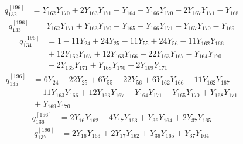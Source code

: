 \begin{equation}\label{q196:row:132}
\begin{aligned}
q_{132}^{[196]} &={} Y_{162}Y_{170} + 2Y_{163}Y_{171} - Y_{164} - Y_{166}Y_{170} - 2Y_{167}Y_{171} - Y_{168}
\end{aligned}
\end{equation}
\begin{equation}\label{q196:row:133}
\begin{aligned}
q_{133}^{[196]} &={} Y_{162}Y_{171} + Y_{163}Y_{170} - Y_{165} - Y_{166}Y_{171} - Y_{167}Y_{170} - Y_{169}
\end{aligned}
\end{equation}
\begin{equation}\label{q196:row:134}
\begin{aligned}
q_{134}^{[196]} &={} 1 - 11Y_{24} + 24Y_{25} - 11Y_{55} + 24Y_{56} - 11Y_{162}Y_{166}\\
&{} + 12Y_{162}Y_{167} + 12Y_{163}Y_{166} - 22Y_{163}Y_{167} - Y_{164}Y_{170}\\
&{} - 2Y_{165}Y_{171} + Y_{168}Y_{170} + 2Y_{169}Y_{171}
\end{aligned}
\end{equation}
\begin{equation}\label{q196:row:135}
\begin{aligned}
q_{135}^{[196]} &={} 6Y_{24} - 22Y_{25} + 6Y_{55} - 22Y_{56} + 6Y_{162}Y_{166} - 11Y_{162}Y_{167}\\
&{} - 11Y_{163}Y_{166} + 12Y_{163}Y_{167} - Y_{164}Y_{171} - Y_{165}Y_{170} + Y_{168}Y_{171}\\
&{} + Y_{169}Y_{170}
\end{aligned}
\end{equation}
\begin{equation}\label{q196:row:136}
\begin{aligned}
q_{136}^{[196]} &={} 2Y_{16}Y_{162} + 4Y_{17}Y_{163} + Y_{36}Y_{164} + 2Y_{37}Y_{165}
\end{aligned}
\end{equation}
\begin{equation}\label{q196:row:137}
\begin{aligned}
q_{137}^{[196]} &={} 2Y_{16}Y_{163} + 2Y_{17}Y_{162} + Y_{36}Y_{165} + Y_{37}Y_{164}
\end{aligned}
\end{equation}
